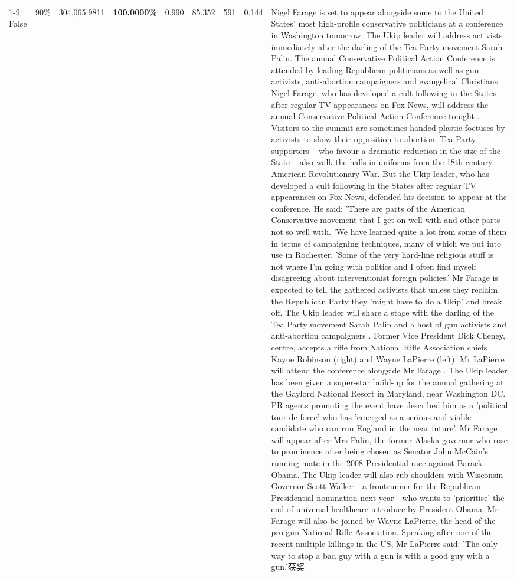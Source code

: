 \begin{table}[H]
\begin{tabular}{lllrlllll}
\cline{1-9} \cline{2-9}
False & 90\% & \color{red} 304,065.9811 & \bfseries \color{red} 100.0000\% & 0.990 & 85.352 & 591 & 0.144 & Nigel Farage is set to appear alongside some to the United States' most high-profile conservative politicians at a conference in Washington tomorrow. The Ukip leader will address activists immediately after the darling of the Tea Party movement Sarah Palin. The annual Conservative Political Action Conference is attended by leading Republican politicians as well as gun activists, anti-abortion campaigners and evangelical Christians. Nigel Farage, who has developed a cult following in the States after regular TV appearances on Fox News, will address the annual Conservative Political Action Conference tonight . Visitors to the summit are sometimes handed plastic foetuses by activists to show their opposition to abortion. Tea Party supporters – who favour a dramatic reduction in the size of the State – also walk the halls in uniforms from the 18th-century American Revolutionary War. But the Ukip leader, who has developed a cult following in the States after regular TV appearances on Fox News, defended his decision to appear at the conference. He said: 'There are parts of the American Conservative movement that I get on well with and other parts not so well with. 'We have learned quite a lot from some of them in terms of campaigning techniques, many of which we put into use in Rochester. 'Some of the very hard-line religious stuff is not where I'm going with politics and I often find myself disagreeing about interventionist foreign policies.' Mr Farage is expected to tell the gathered activists that unless they reclaim the Republican Party they 'might have to do a Ukip' and break off. The Ukip leader will share a stage with the darling of the Tea Party movement Sarah Palin and a host of gun activists and anti-abortion campaigners . Former Vice President Dick Cheney, centre, accepts a rifle from National Rifle Association chiefs Kayne Robinson (right) and Wayne LaPierre (left). Mr LaPierre will attend the conference alongside Mr Farage . The Ukip leader has been given a super-star build-up for the annual gathering at the Gaylord National Resort in Maryland, near Washington DC. PR agents promoting the event have described him as a 'political tour de force' who has 'emerged as a serious and viable candidate who can run England in the near future'. Mr Farage will appear after Mrs Palin, the former Alaska governor who rose to prominence after being chosen as Senator John McCain's running mate in the 2008 Presidential race against Barack Obama. The Ukip leader will also rub shoulders with Wisconsin Governor Scott Walker - a frontrunner for the Republican Presidential nomination next year - who wants to 'prioritise' the end of universal healthcare introduce by President Obama. Mr Farage will also be joined by Wayne LaPierre, the head of the pro-gun National Rifle Association. Speaking after one of the recent multiple killings in the US, Mr LaPierre said: 'The only way to stop a bad guy with a gun is with a good guy with a gun.'获奖 \\

\end{tabular}
\end{table}
